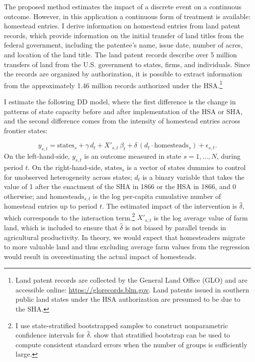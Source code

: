 \documentclass[12pt]{article}
\begin{document}
The proposed method estimates the impact of a discrete event on a continuous outcome. However, in this application a continuous form of treatment is available: homestead entries. I derive information on homestead entries from land patent records, which provide information on the initial transfer of land titles from the federal government, including the patentee's name, issue date, number of acres, and location of the land title. The land patent records describe over 5 million transfers of land from the U.S. government to states, firms, and individuals. Since the records are organized by authorization, it is possible to extract information from the approximately 1.46 million records authorized under the HSA.\footnote{Land patent records are collected by the General Land Office (GLO) and are accessible online: \url{https://glorecords.blm.gov}. Land patents issued in southern public land states under the HSA authorization are presumed to be due to the SHA.}

I estimate the following DD model, where the first difference is the change in patterns of state capacity before and after implementation of the HSA or SHA, and the second difference comes from the intensity of homestead entries across frontier states:

\begin{equation} 
y_{s, t} =  \text{states}_s + \gamma \, d_t + X'_{s,t} \, \beta_t + \delta \, (d_t \cdot \text{homesteads}_s) + \epsilon_{s, t}. \label{eq:dd} 
\end{equation} On the left-hand-side, $y_{s, t}$ is an outcome measured in state $s = 1, \ldots, N$, during period $t$. On the right-hand-side, $\text{states}_s$ is a vector of states dummies to control for unobserved heterogeneity across states; $d_t$ is a binary variable that takes the value of 1 after the enactment of the SHA in 1866 or the HSA in 1866, and 0 otherwise; and $\text{homesteads}_{s, t}$ is the log per-capita cumulative number of homestead entries up to period $t$. The estimated impact of the intervention is $\hat{\delta}$, which corresponds to the interaction term.\footnote{I use state-stratified bootstrapped samples to construct nonparametric confidence intervals for $\hat{\delta}$. \citet{bertrand2004much} show that stratified bootstrap can be used to compute consistent standard errors when the number of groups is sufficiently large.} $X'_{s,t}$ is the log average value of farm land, which is included to ensure that $\hat{\delta}$ is not biased by parallel trends in agricultural productivity. In theory, we would expect that homesteaders migrate to more valuable land and thus excluding average farm values from the regression would result in overestimating the actual impact of homesteads. 
\end{document}
